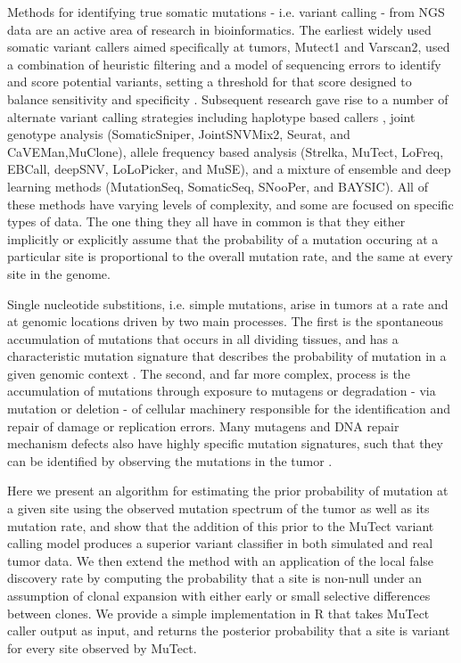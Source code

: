 \documentclass[a4,center,fleqn]{NAR}
\begin{document}
Methods for identifying true somatic mutations - i.e. variant calling -  from NGS data are an active area of research in bioinformatics.
The earliest widely used somatic variant callers aimed specifically at tumors, Mutect1 and Varscan2, used a combination of heuristic filtering and a model of sequencing errors to identify and score potential variants, setting a threshold for that score designed to balance sensitivity and specificity \citep{Koboldt2012,Cibulskis2013}.
Subsequent research gave rise to a number of alternate variant calling strategies including haplotype based callers \citep{Garrison2012},
joint genotype analysis (SomaticSniper, JointSNVMix2, Seurat, and CaVEMan,MuClone)\citep{Larson2012,Roth2012a,Christoforides2013,Jones2016,Dorri2019}, allele frequency based analysis (Strelka, MuTect, LoFreq, EBCall, deepSNV, LoLoPicker, and MuSE)\citep{Saunders2012,Wilm2012,Shiraishi2013b,Gerstung2012,Carrot-Zhang2017,Fan2016}, and a mixture of ensemble and deep learning methods (MutationSeq, SomaticSeq, SNooPer, and BAYSIC).
All of these methods have varying levels of complexity, and some are focused on specific types of data.
The one thing they all have in common is that they either implicitly or explicitly assume that the probability of a mutation occuring at a particular site is proportional to the overall mutation rate, and the same at every site in the genome.

Single nucleotide substitions, i.e. simple mutations, arise in tumors at a rate and at genomic locations driven by two main processes. 
The first is the spontaneous accumulation of mutations that occurs in all dividing tissues, and has a characteristic mutation signature that describes the probability of mutation in a given genomic context \citep{Nik-Zainal2012a,Alexandrov2015,Lee-Six2018}. 
The second, and far more complex, process is the accumulation of mutations through exposure to mutagens or degradation - via mutation or deletion - of cellular machinery responsible for the identification and repair of damage or replication errors. 
Many mutagens and DNA repair mechanism defects also have highly specific mutation signatures, such that they can be identified by observing the mutations in the tumor \citep{Alexandrov2013a,Helleday2014a,Nik-Zainal2016,Kandoth2013,Alexandrov2016}.

Here we present an algorithm for estimating the prior probability of mutation at a given site using the observed mutation spectrum of the tumor as well as its mutation rate, and show that the addition of this prior to the MuTect variant calling model produces a superior variant classifier in both simulated and real tumor data.
We then extend the method with an application of the local false discovery rate by computing the probability that a site is non-null under an assumption of clonal expansion with either early or small selective differences between clones.
We provide a simple implementation in R that takes MuTect caller output as input, and returns the posterior probability that a site is variant for every site observed by MuTect.
\end{document}
